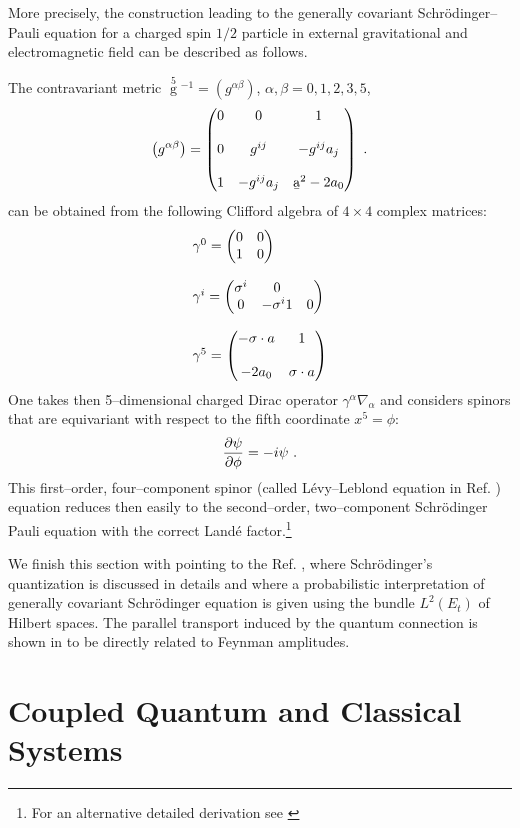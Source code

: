 \documentclass[12pt]{article}
\def\be{\begin{equation}} \def\ee{\end{equation}}
\begin{document}
More precisely,  the construction leading  to the generally
covariant Schr\"{o}\-din\-ger--Pauli equation for a charged spin $1/2$
particle in external gravitational and electromagnetic field can
be described as follows. 

The contravariant metric $\mathop{g}\limits^{5}{}^{-1}
=\left ( g^{\alpha \beta}\right)$, 
$\alpha,  \beta = 0, 1, 2, 3, 5$, 
\be
\left ( g^{\alpha \beta} \right)
= \begin{pmatrix} 0 & 0 & 1 \cr\cr
0 & g^{ij} & -g^{ij}a_{j} \cr\cr
1 & -g^{ij}a_{j} & \b{a}^{2}-2a_{0} 
\end{pmatrix}
\ . 
\ee
can be obtained from the following Clifford algebra of $4\times 4$
complex matrices: 
\be
\begin{array}{l}
\gamma^{0} = \begin{pmatrix}0 & 0 \cr
1 & 0
\end{pmatrix}
\cr\cr
\gamma^{i} = \begin{pmatrix} \sigma^{i} & 0 \cr
0 & - \sigma^{i} 
1 & 0
\end{pmatrix}
\cr\cr
\gamma^{5} = \begin{pmatrix}-{\sigma}\cdot {a} & 1 \cr\cr
 -2a_{0} & {\sigma} \cdot {a}
 \end{pmatrix}
\end{array}
\ee
One takes then 5--dimensional charged Dirac operator $\gamma^{\alpha}
\nabla_{\alpha}$ and considers spinors that are equivariant with
respect to the fifth coordinate $x^{5} = \phi: $
\be
{\partial \psi \over \partial \phi} = - i \psi \ . 
\ee
This first--order,  four--component spinor  (called L\'evy--Leblond
equation in Ref.  \cite{kun}) equation reduces then easily to the
second--order,  two--component Schr\"{o}\-din\-ger Pauli equation
with the correct Land\'e factor.\footnote{For an alternative
detailed derivation see \cite{can} }



We finish this section with pointing to the Ref.  \cite{jamo}, 
where Schr\"{o}din\-ger's quantization is discussed in details and
where a probabilistic interpretation of generally covariant
Schr\"{o}dinger equation is given using the bundle
$L^{2} (E_{t})$ of Hilbert spaces.  The parallel transport induced
by the quantum connection is shown in \cite{jamo} to be directly
related to Feynman amplitudes. 
\section{Coupled Quantum and Classical Systems}
\end{document}
